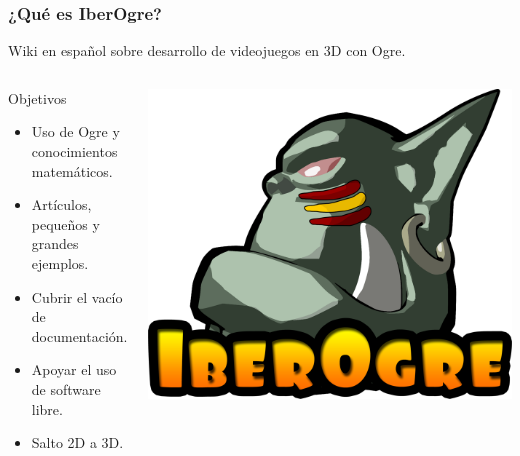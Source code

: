 \documentclass[green]{beamer}
\begin{document}
\begin{frame}
\transdissolve
    \frametitle{¿Qué es IberOgre?}
    
    Wiki en español sobre desarrollo de videojuegos en 3D con Ogre.

    \begin{columns}[c]
    \column{200pt}
        
	\begin{block}{Objetivos}
            \begin{itemize}
                \item Uso de Ogre y conocimientos matemáticos.
                \item Artículos, pequeños y grandes ejemplos.
                \item Cubrir el vacío de documentación.
                \item Apoyar el uso de software libre.
		\item Salto 2D a 3D.
            \end{itemize}            
        \end{block}

    \column{100pt}
	\begin{center}
	    \includegraphics[scale=0.08]{img/iberogre.png}
	\end{center}
    \end{columns} 
\end{frame}
\end{document}
